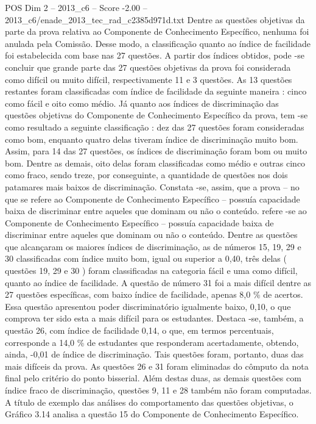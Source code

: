 \begin{textsample}{POS Dim 2 – 2013\_c6 – Score -2.00 – 2013\_c6/enade\_2013\_tec\_rad\_c2385d971d.txt}
Dentre as questões objetivas da parte da prova relativa ao Componente de Conhecimento Específico, nenhuma foi anulada pela Comissão.
Desse modo, a classificação quanto ao índice de facilidade foi estabelecida com base nas 27 questões.
A partir dos índices obtidos, pode -se concluir que grande parte das 27 questões objetivas da prova foi considerada como difícil ou muito difícil, respectivamente 11 e 3 questões.
As 13 questões restantes foram classificadas com índice de facilidade da seguinte maneira : cinco como fácil e oito como médio.
Já quanto aos índices de discriminação das questões objetivas do Componente de Conhecimento Específico da prova, tem -se como resultado a seguinte classificação : dez das 27 questões foram consideradas como bom, enquanto quatro delas tiveram índice de discriminação muito bom.
Assim, para 14 das 27 questões, os índices de discriminação foram bom ou muito bom.
Dentre as demais, oito delas foram classificadas como médio e outras cinco como fraco, sendo treze, por conseguinte, a quantidade de questões nos dois patamares mais baixos de discriminação.
Constata -se, assim, que a prova – no que se refere ao Componente de Conhecimento Específico – possuía capacidade baixa de discriminar entre aqueles que dominam ou não o conteúdo. refere -se ao Componente de Conhecimento Específico – possuía capacidade baixa de discriminar entre aqueles que dominam ou não o conteúdo.
Dentre as questões que alcançaram os maiores índices de discriminação, as de números 15, 19, 29 e 30 classificadas com índice muito bom, igual ou superior a 0,40, três delas ( questões 19, 29 e 30 ) foram classificadas na categoria fácil e uma como difícil, quanto ao índice de facilidade.
A questão de número 31 foi a mais difícil dentre as 27 questões específicas, com baixo índice de facilidade, apenas 8,0 \% de acertos.
Essa questão apresentou poder discriminatório igualmente baixo, 0,10, o que comprova ter sido esta a mais difícil para os estudantes.
Destaca -se, também, a questão 26, com índice de facilidade 0,14, o que, em termos percentuais, corresponde a 14,0 \% de estudantes que responderam acertadamente, obtendo, ainda, -0,01 de índice de discriminação.
Tais questões foram, portanto, duas das mais difíceis da prova.
As questões 26 e 31 foram eliminadas do cômputo da nota final pelo critério do ponto bisserial.
Além destas duas, as demais questões com índice fraco de discriminação, questões 9, 11 e 28 também não foram computadas.
A título de exemplo das análises do comportamento das questões objetivas, o Gráfico 3.14 analisa a questão 15 do Componente de Conhecimento Específico.

\end{textsample}
